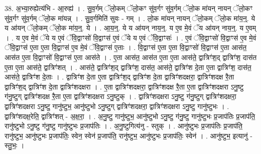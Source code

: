 \documentclass[17pt]{extarticle}
\begin{document}
38. अ॒भ्या॒रुह्येत्य॑भि - आ॒रुह्य॑ । . सु॒व॒र्गम् ॅलो॒कम् ॅलो॒कꣳ सु॑व॒र्गꣳ सु॑व॒र्गम् ॅलो॒क मा॑यन् नायन् ॅलो॒कꣳ सु॑व॒र्गꣳ सु॑व॒र्गम् ॅलो॒क मा॑यन्न् । . सु॒व॒र्गमिति॑ सुवः - गम् । . लो॒क मा॑यन् नायन् ॅलो॒कम् ॅलो॒क मा॑य॒न्॒. ये य आ॑यन् ॅलो॒कम् ॅलो॒क मा॑य॒न्॒. ये । . आ॒य॒न्॒. ये य आ॑यन् नाय॒न्॒. य ए॒व मे॒वं ॅय आ॑यन् नाय॒न्॒. य ए॒वम् । . य ए॒व मे॒वं ॅये य ए॒वं ॅवि॒द्वाꣳसो॑ वि॒द्वाꣳस॑ ए॒वं ॅये य ए॒वं ॅवि॒द्वाꣳसः॑ । . ए॒वं ॅवि॒द्वाꣳसो॑ वि॒द्वाꣳस॑ ए॒व मे॒वं ॅवि॒द्वाꣳस॑ ए॒ता ए॒ता वि॒द्वाꣳस॑ ए॒व मे॒वं ॅवि॒द्वाꣳस॑ ए॒ताः । . वि॒द्वाꣳस॑ ए॒ता ए॒ता वि॒द्वाꣳसो॑ वि॒द्वाꣳस॑ ए॒ता आस॑त॒ आस॑त ए॒ता वि॒द्वाꣳसो॑ वि॒द्वाꣳस॑ ए॒ता आस॑ते । . ए॒ता आस॑त॒ आस॑त ए॒ता ए॒ता आस॑ते॒ द्वात्रिꣳ॑श॒द् द्वात्रिꣳ॑श॒ दास॑त ए॒ता ए॒ता आस॑ते॒ द्वात्रिꣳ॑शत् । . आस॑ते॒ द्वात्रिꣳ॑श॒द् द्वात्रिꣳ॑श॒ दास॑त॒ आस॑ते॒ द्वात्रिꣳ॑श दे॒ता ए॒ता द्वात्रिꣳ॑श॒ दास॑त॒ आस॑ते॒ द्वात्रिꣳ॑श दे॒ताः । . द्वात्रिꣳ॑श दे॒ता ए॒ता द्वात्रिꣳ॑श॒द् द्वात्रिꣳ॑श दे॒ता द्वात्रिꣳ॑शदक्षरा॒ द्वात्रिꣳ॑शदक्ष रै॒ता द्वात्रिꣳ॑श॒द् द्वात्रिꣳ॑श दे॒ता द्वात्रिꣳ॑शदक्षरा । . ए॒ता द्वात्रिꣳ॑शदक्षरा॒ द्वात्रिꣳ॑शदक्ष रै॒ता ए॒ता द्वात्रिꣳ॑शदक्षरा ऽनु॒ष्टु ग॑नु॒ष्टुग् द्वात्रिꣳ॑शदक्ष रै॒ता ए॒ता द्वात्रिꣳ॑शदक्षरा ऽनु॒ष्टुक् । . द्वात्रिꣳ॑शदक्षरा ऽनु॒ष्टु ग॑नु॒ष्टुग् द्वात्रिꣳ॑शदक्षरा॒ द्वात्रिꣳ॑शदक्षरा ऽनु॒ष्टु गानु॑ष्टुभ॒ आनु॑ष्टुभो ऽनु॒ष्टुग् द्वात्रिꣳ॑शदक्षरा॒ द्वात्रिꣳ॑शदक्षरा ऽनु॒ष्टु गानु॑ष्टुभः । . द्वात्रिꣳ॑शदक्ष॒रेति॒ द्वात्रिꣳ॑शत् - अ॒क्ष॒रा॒ । . अ॒नु॒ष्टु गानु॑ष्टुभ॒ आनु॑ष्टुभो ऽनु॒ष्टु ग॑नु॒ष्टु गानु॑ष्टुभः प्र॒जाप॑तिः प्र॒जाप॑ति॒ रानु॑ष्टुभो ऽनु॒ष्टु ग॑नु॒ष्टु गानु॑ष्टुभः प्र॒जाप॑तिः । . अ॒नु॒ष्टुगित्य॑नु - स्तुक् । . आनु॑ष्टुभः प्र॒जाप॑तिः प्र॒जाप॑ति॒ रानु॑ष्टुभ॒ आनु॑ष्टुभः प्र॒जाप॑तिः॒ स्वेन॒ स्वेन॑ प्र॒जाप॑ति॒ रानु॑ष्टुभ॒ आनु॑ष्टुभः प्र॒जाप॑तिः॒ स्वेन॑ । . आनु॑ष्टुभ॒ इत्यानु॑ - स्तु॒भः॒ । \newline
\end{document}
